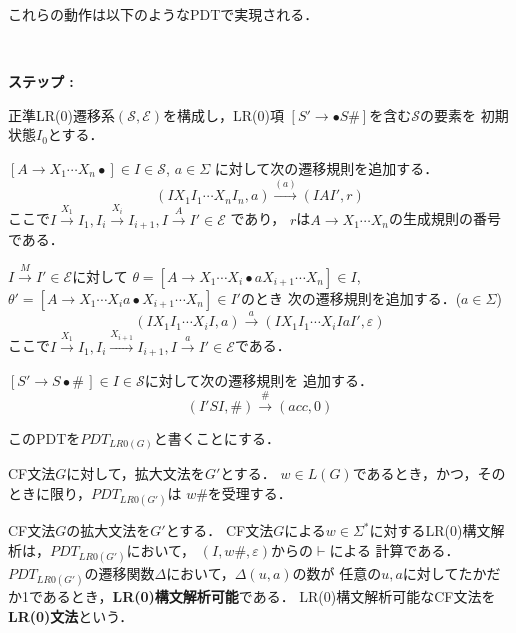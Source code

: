 \documentclass[a4j,dvipdfmx]{jbook}
\begin{document}
これらの動作は以下のようなPDTで実現される．

\begin{Alg}\label{PDTLR0}\
  \begin{list}{{\rm\bf ステップ :}}{}
    \item 正準LR(0)遷移系$(\mathcal{S},\mathcal{E})$を構成し，LR(0)項
          $[S'\rightarrow\bullet S\texttt{\#}]$を含む$\mathcal{S}$の要素を
          初期状態$I_0$とする．
    \item $[A\rightarrow X_1\cdots X_n\bullet]\in I\in\mathcal{S}$, $a\in\Sigma$
          に対して次の遷移規則を追加する．
          \[(IX_1I_1\cdots X_nI_n,a)\xrightarrow{(a)}(IAI',r)\]
          ここで$I\xrightarrow{X_1}I_1,I_i\xrightarrow{X_i}I_{i+1},I\xrightarrow{A}I'\in\mathcal{E}$
          であり，
          $r$は$A\rightarrow X_1\cdots X_n$の生成規則の番号である．
    \item $I\xrightarrow{M}I'\in\mathcal{E}$に対して
          $\theta=[A\rightarrow X_1\cdots X_i\bullet a X_{i+1}\cdots X_n]\in I$,
          $\theta'=[A\rightarrow X_1\cdots X_i a\bullet X_{i+1}\cdots X_n]\in I'$のとき
          次の遷移規則を追加する．($a\in\Sigma$)
          \[(IX_1I_1\cdots X_iI,a)\xrightarrow{a}(IX_1I_1\cdots X_iIaI',\varepsilon)\]
          ここで$I\xrightarrow{X_1}I_1,I_i\xrightarrow{X_{i+1}}I_{i+1},I\xrightarrow{a}I'\in\mathcal{E}$である．
    \item $[S'\rightarrow S\bullet\texttt{\#}\,]\in I\in\mathcal{S}$に対して次の遷移規則を
          追加する．
          \[(I'SI,\texttt{\#})\xrightarrow{\texttt{\#}}(acc,0)\]
  \end{list}
\end{Alg}

このPDTを$PDT_{LR0(G)}$と書くことにする．
\begin{Prop}
  CF文法$G$に対して，拡大文法を$G'$とする．
  $w\in L(G)$であるとき，かつ，そのときに限り，$PDT_{LR0(G')}$は
  $w\texttt{\#}$を受理する．
\end{Prop}

\begin{Def}
  CF文法$G$の拡大文法を$G'$とする．
  CF文法$G$による$w\in\Sigma^\ast$に対するLR(0)構文解析は，$PDT_{LR0(G')}$において，
  $(I,w\texttt{\#},\varepsilon)$からの$\vdash$による
  計算である．
  $PDT_{LR0(G')}$の遷移関数$\Delta$において，$\Delta(u,a)$の数が
  任意の$u,a$に対してたかだか1であるとき，{\bf LR(0)構文解析可能}である．
  LR(0)構文解析可能なCF文法を{\bf LR(0)文法}という．
\end{Def}
\end{document}
